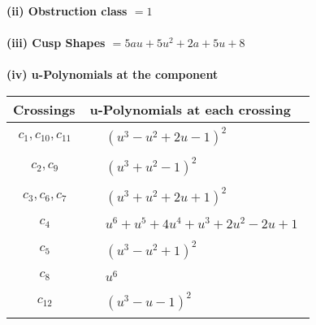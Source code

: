 \documentclass[1p]{elsarticle_modified}
\theoremstyle{definition}
\begin{document}
\flushleft \textbf{(ii) Obstruction class $= 1$}\\~\\
\flushleft \textbf{(iii) Cusp Shapes $= 5 a u+5 u^2+2 a+5 u+8$}\\~\\
\newpage\renewcommand{\arraystretch}{1}
\flushleft \textbf{(iv) u-Polynomials at the component}\newline \\
\begin{tabular}{m{50pt}|m{274pt}}
Crossings & \hspace{64pt}u-Polynomials at each crossing \\
\hline $$\begin{aligned}c_{1},c_{10},c_{11}\end{aligned}$$&$\begin{aligned}
&(u^3- u^2+2 u-1)^2
\end{aligned}$\\
\hline $$\begin{aligned}c_{2},c_{9}\end{aligned}$$&$\begin{aligned}
&(u^3+u^2-1)^2
\end{aligned}$\\
\hline $$\begin{aligned}c_{3},c_{6},c_{7}\end{aligned}$$&$\begin{aligned}
&(u^3+u^2+2 u+1)^2
\end{aligned}$\\
\hline $$\begin{aligned}c_{4}\end{aligned}$$&$\begin{aligned}
&u^6+u^5+4 u^4+u^3+2 u^2-2 u+1
\end{aligned}$\\
\hline $$\begin{aligned}c_{5}\end{aligned}$$&$\begin{aligned}
&(u^3- u^2+1)^2
\end{aligned}$\\
\hline $$\begin{aligned}c_{8}\end{aligned}$$&$\begin{aligned}
&u^6
\end{aligned}$\\
\hline $$\begin{aligned}c_{12}\end{aligned}$$&$\begin{aligned}
&(u^3- u-1)^2
\end{aligned}$\\
\hline
\end{tabular}\\~\\
\end{document}
